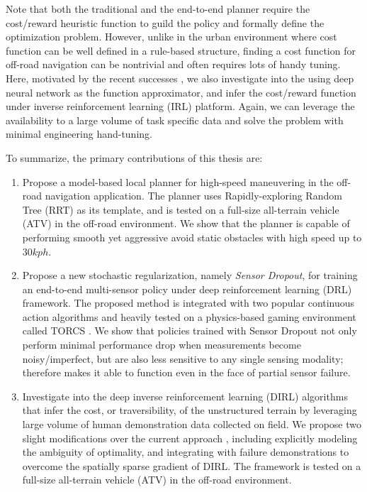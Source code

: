 \documentclass[../thesis.tex]{subfiles}
\begin{document}
Note that both the traditional and the end-to-end planner require the cost/reward heuristic function to guild the policy and formally define the optimization problem. 
However, unlike in the urban environment where cost function can be well defined in a rule-based structure, finding a cost function for off-road navigation can be nontrivial and often requires lots of handy tuning. \cite{silver2010learning}
Here, motivated by the recent successes \cite{wulfmeier2015maximum,wulfmeier2016watch}, we also investigate into the using deep neural network as the function approximator, and infer the cost/reward function under inverse reinforcement learning (IRL) platform. 
Again, we can leverage the availability to a large volume of task specific data and solve the problem with minimal engineering hand-tuning.

To summarize, the primary contributions of this thesis are:
\begin{enumerate}

    \item %
    Propose a model-based local planner for high-speed maneuvering in the off-road navigation application. 
    The planner uses Rapidly-exploring Random Tree (RRT) \cite{kuffner2000rrt} as its template, and is tested on a full-size all-terrain vehicle (ATV) in the off-road environment. 
    We show that the planner is capable of performing smooth yet aggressive avoid static obstacles with high speed up to $30 kph$.

    \item %
    Propose a new stochastic regularization, namely \emph{Sensor Dropout}, for training an end-to-end multi-sensor policy under deep reinforcement learning (DRL) framework. 
    The proposed method is integrated with two popular continuous action algorithms and heavily tested on a physics-based gaming environment called TORCS \cite{wymann2000torcs}. 
    We show that policies trained with Sensor Dropout not only perform minimal performance drop when measurements become noisy/imperfect, but are also less sensitive to any single sensing modality; therefore makes it able to function even in the face of partial sensor failure.

    \item %
    Investigate into the deep inverse reinforcement learning (DIRL) algorithms that infer the cost, or traversibility, of the unstructured terrain by leveraging large volume of human demonstration data collected on field. 
    We propose two slight modifications over the current approach \cite{wulfmeier2015maximum}, including explicitly modeling the ambiguity of optimality, and integrating with failure demonstrations to overcome the spatially sparse gradient of DIRL.
    The framework is tested on a full-size all-terrain vehicle (ATV) in the off-road environment.

\end{enumerate}
\end{document}
